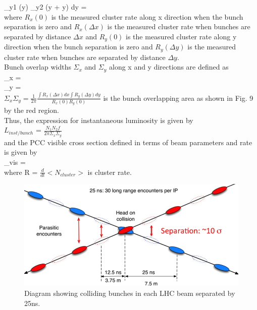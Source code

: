 \int \rho_{y1} (y) \rho_{y2} (y + \Delta y) dy =  \\

where $R_x(0)$ is the measured cluster rate along x direction when the bunch separation is zero and $R_x(\Delta x)$ is the measured cluster rate when bunches are separated by distance $\Delta x$ and $R_y(0)$ is the measured cluster rate along y direction when the bunch separation is zero and $R_y(\Delta y)$ is the measured cluster rate when bunches are separated by distance $\Delta y$. \\

Bunch overlap widths $\Sigma_x$ and $\Sigma_y$ along x and y directions are defined as \\

\Sigma_x =   \\

\Sigma_y =    \\

$\Sigma_x \Sigma_y = \frac{1}{2 \pi} \frac{\int R_x(\Delta x)dx \int R_y(\Delta y) dy}{R_x(0) R_y(0)}$  is the bunch overlapping area as shown in Fig. 9 by the red region.\\

\newpage Thus, the expression for instantaneous luminosity is given by \\

$L_{inst/bunch}$ = $\frac{N_1 N_2 f}{2\pi \Sigma_x \Sigma_y}$ \\

and the PCC visible cross section defined in terms of beam parameters and rate is given by \\

\sigma_{vis} =  \\

where R = $\frac{d}{dt} <N_{cluster}>$  is cluster rate.\\

\begin{figure}[H]
  \centering
  \includegraphics[width=0.6\columnwidth]{./LHCReport_1_image_cut.png}
  \caption{ \onehalfspacing Diagram showing colliding bunches in each LHC beam separated by 25ns.}
  \label{fig:CMS}
\end{figure}




